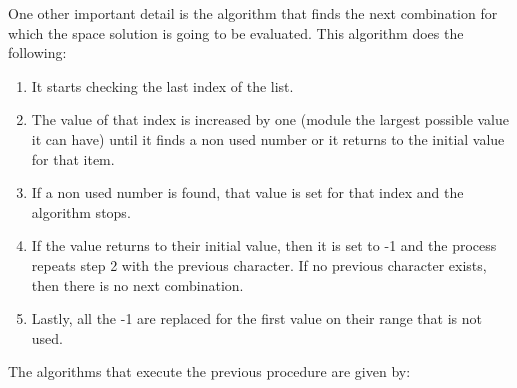 \documentclass[11pt]{article}
\theoremstyle{definition}
\theoremstyle{remark}
\theoremstyle{remark}
\newcommand{\code}[2]{\inputminted[frame=lines, linenos, firstline=#1,
  lastline=#2]{cpp}{../src/roman-numerals.cpp}}
\begin{document}
One other important detail is the algorithm that finds the next combination for
which the space solution is going to be evaluated. This algorithm does the
following:
\begin{enumerate}
  \item It starts checking the last index of the list.
  \item The value of that index is increased by one (module the largest possible
    value it can have) until it finds a non used number or it returns to the
    initial value for that item.
  \item If a non used number is found, that value is set for that index and the
    algorithm stops.
  \item If the value returns to their initial value, then it is set to -1 and
    the process repeats step 2 with the previous character. If no previous
    character exists, then there is no next combination.
  \item Lastly, all the -1 are replaced for the first value on their range that
    is not used.
\end{enumerate}

The algorithms that execute the previous procedure are given by: \code{246}{264}
\code{267}{281} \code{284}{288}
\end{document}
